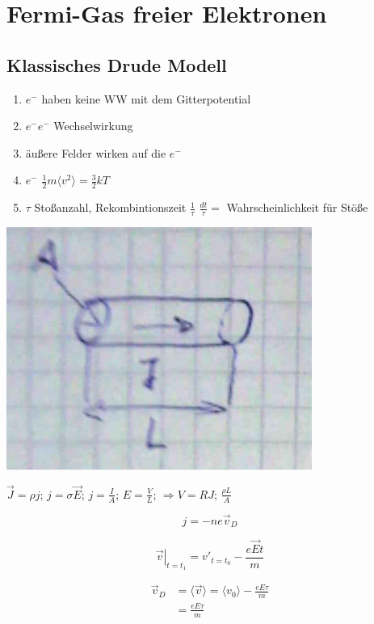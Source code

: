 


\tableofcontents
\setcounter{chapter}{7}
\chapter{Fermi-Gas freier Elektronen}

\section{Klassisches Drude Modell}

\begin{enumerate}
\item \(e^{-}\) haben keine WW mit dem Gitterpotential
\item \(e^{-}e^{-}\) Wechselwirkung
\item äußere Felder wirken auf die \(e^{-}\)
\item  \(e^{-}\) \(\frac{1}{2}m\langle v^2\rangle =\frac{3}{2}kT\)
\item \(\tau\) Stoßanzahl, Rekombintionszeit \(\frac{1}{\tau}\) \(\frac{dt}{\tau}=\) Wahrscheinlichkeit für Stöße
\end{enumerate}

\includegraphics[width=0.75\textwidth]{kap06_17.png}

\(\vec J=\rho j\); \(j=\sigma\vec E\); \(j=\frac{I}{A}\); \(E=\frac{V}{L}\); \(\Rightarrow V=RJ\); \( \frac{\rho L}{A}\)

\[ j = -ne\vec v_D\]

\[\left. \vec v\right|_{t=t_1}=v'_{t=t_0}-\frac{e\vec E t}{m} \]

\begin{align}
\vec v_D &= \langle \vec v \rangle  = \langle v_0\rangle -\frac{eE\tau}{m} \\
&=\frac{eE\tau}{m}
\end{align}


